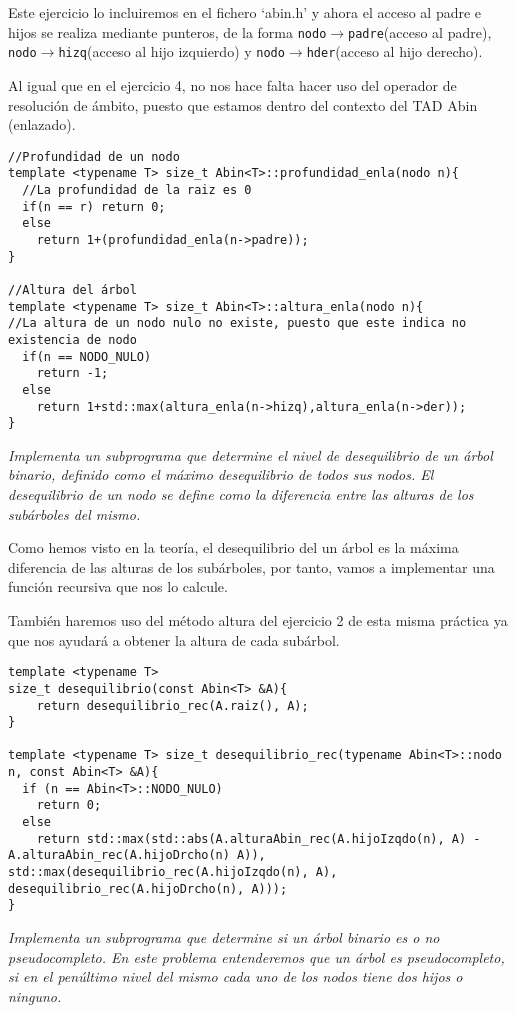 Este ejercicio lo incluiremos en el fichero `abin.h' y ahora el acceso al padre e hijos se realiza mediante punteros, de la forma \texttt{nodo\(\rightarrow\)padre}(acceso al padre), \texttt{nodo\(\rightarrow\)hizq}(acceso al hijo izquierdo) y \texttt{nodo\(\rightarrow\)hder}(acceso al hijo derecho).

Al igual que en el ejercicio 4, no nos hace falta hacer uso del operador de resolución de ámbito, puesto que estamos dentro del contexto del TAD Abin (enlazado).
\begin{verbatim}
//Profundidad de un nodo
template <typename T> size_t Abin<T>::profundidad_enla(nodo n){
  //La profundidad de la raiz es 0
  if(n == r) return 0;
  else
    return 1+(profundidad_enla(n->padre));
}

//Altura del árbol
template <typename T> size_t Abin<T>::altura_enla(nodo n){
//La altura de un nodo nulo no existe, puesto que este indica no existencia de nodo
  if(n == NODO_NULO)
    return -1;
  else
    return 1+std::max(altura_enla(n->hizq),altura_enla(n->der));
}

\end{verbatim}
\textbf{\large{}}\textit{ Implementa un subprograma que determine el nivel de desequilibrio de un árbol binario, definido como el máximo desequilibrio de todos sus nodos. El desequilibrio de un nodo se define como la diferencia entre las alturas de los subárboles del mismo.}

Como hemos visto en la teoría, el desequilibrio del un árbol es la máxima diferencia de las alturas de los subárboles, por tanto, vamos a implementar una función recursiva que nos lo calcule.

También haremos uso del método altura del ejercicio 2 de esta misma práctica ya que nos ayudará a obtener la altura de cada subárbol.

\begin{verbatim}
template <typename T>
size_t desequilibrio(const Abin<T> &A){
    return desequilibrio_rec(A.raiz(), A);
}

template <typename T> size_t desequilibrio_rec(typename Abin<T>::nodo n, const Abin<T> &A){
  if (n == Abin<T>::NODO_NULO)
    return 0;
  else
    return std::max(std::abs(A.alturaAbin_rec(A.hijoIzqdo(n), A) - A.alturaAbin_rec(A.hijoDrcho(n) A)), std::max(desequilibrio_rec(A.hijoIzqdo(n), A), desequilibrio_rec(A.hijoDrcho(n), A)));
}
\end{verbatim}
\textbf{\large{}}\textit{ Implementa un subprograma que determine si un árbol binario es o no pseudocompleto.
En este problema entenderemos que un árbol es pseudocompleto, si en el penúltimo nivel
del mismo cada uno de los nodos tiene dos hijos o ninguno.}


